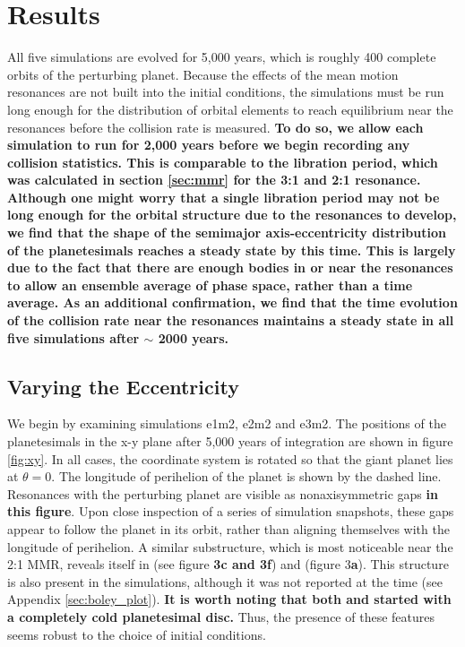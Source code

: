 \documentclass[fleqn,usenatbib]{mnras}
\begin{document}
\section{Results} \label{sec:results}

All five simulations are evolved for 5,000 years, which is roughly 400 complete orbits of the perturbing planet. Because the effects of the mean 
motion resonances are not built into the initial conditions, the simulations must be run long enough for the distribution of orbital elements to reach 
equilibrium near the resonances before the collision rate is measured. \textbf{To do so, we allow each simulation to run for 2,000 years before we begin recording any collision statistics. 
This is comparable to the libration period, which was calculated in section \ref{sec:mmr} for the 3:1 and 2:1 resonance. Although one might worry that a single libration period may not be 
long enough for the orbital structure due to the resonances to develop, we find that the shape of the semimajor axis-eccentricity distribution of the planetesimals reaches a steady state by 
this time. This is largely due to the fact that there are enough bodies in or near the resonances to allow an ensemble average of phase space, rather than a time average. As an additional 
confirmation, we find that the time evolution of the collision rate near the resonances maintains a steady state in all five simulations after $\sim$ 2000 years.}

\subsection{Varying the Eccentricity} \label{sec:vary_ecc}

We begin by examining simulations e1m2, e2m2 and e3m2. The positions of the planetesimals in the x-y plane after 5,000 years of integration are 
shown in figure \ref{fig:xy}. In all cases, the coordinate system is rotated so that the giant planet lies at $\theta = 0$. The longitude of perihelion of 
the planet is shown by the dashed line. Resonances with the perturbing planet are visible as nonaxisymmetric gaps \textbf{in this figure}. Upon close inspection of a 
series of simulation snapshots, these gaps appear to follow the planet in its orbit, rather than aligning themselves with the longitude of perihelion. A 
similar substructure, which is most noticeable near the 2:1 MMR, reveals itself in \citet{2000Icar..143...45R} (see figure \textbf{3c and 3f}) and 
\citet{2016ApJ...818..159T} (figure 3\textbf{a}). This structure is also present in the \citet{2017ApJ...850..103B} simulations, although it was not reported at the 
time (see Appendix \ref{sec:boley_plot}). \textbf{It is worth noting that both \citet{2000Icar..143...45R} and \citet{2017ApJ...850..103B} started with a completely cold planetesimal disc.} 
Thus, the presence of these features seems robust to the choice of initial conditions.
\end{document}
